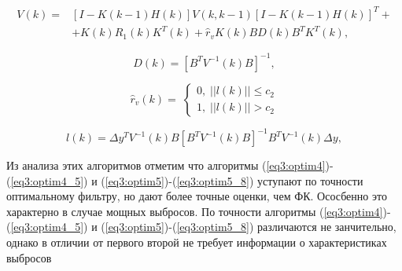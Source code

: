 \begin{equation}\label{eq3:optim5_5}
\begin{split}
V(k)=&[I-K(k-1)H(k)]V(k,k-1)[I-K(k-1)H(k)]^T+\\
&+K(k)R_1(k)K^T(k)+\hat{r}_vK(k)BD(k)B^TK^T(k),
\end{split}
\end{equation}

\begin{equation}\label{eq3:optim5_6}
D(k)=[B^TV^{-1}(k)B]^{-1},
\end{equation}

\begin{equation}\label{eq3:optim5_7}
\hat{r}_v(k)= \;
\begin{cases}
0, \; ||l(k)||\leq c_2 \\    
1, \; ||l(k)||> c_2    
\end{cases}
\end{equation}

\begin{equation}\label{eq3:optim5_8}
l(k)=\Delta y^TV^{-1}(k)B[B^TV^{-1}(k)B]^{-1}B^TV^{-1}(k)\Delta y,
\end{equation}

Из анализа этих алгоритмов \cite{Klekis} отметим что алгоритмы (\ref{eq3:optim4})-(\ref{eq3:optim4_5}) и (\ref{eq3:optim5})-(\ref{eq3:optim5_8}) уступают по точности оптимальному фильтру, но дают более точные оценки, чем ФК.
Ососбенно это характерно в случае мощных выбросов.
По точности алгоритмы (\ref{eq3:optim4})-(\ref{eq3:optim4_5}) и (\ref{eq3:optim5})-(\ref{eq3:optim5_8}) различаются не занчительно, однако в отличии от первого второй не требует информации о характеристиках выбросов

